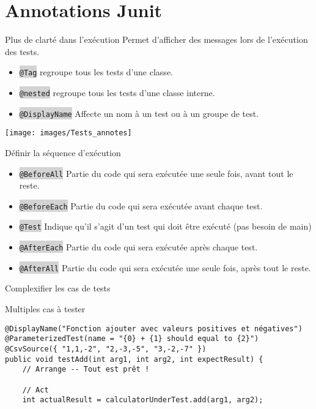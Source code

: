 \documentclass[a4paper]{beamer}
\newcommand{\code}[1]{\colorbox{lightgray}{\lstinline~#1~}}
\begin{document}
{\section{Annotations Junit}
\begin{frame}{Plus de clarté dans l'exécution}
	Permet d'afficher des messages lors de l'exécution des tests.
	\begin{itemize}
		\item \code{@Tag} regroupe tous les tests d'une classe.
		\item \code{@nested} regroupe tous les tests d'une classe interne.
		\item \code{@DisplayName} Affecte un nom à un test ou à un groupe de test.
	\end{itemize}
	\begin{center}
		\texttt{[image: images/Tests\_annotes]}
	\end{center}
\end{frame}

\begin{frame}{Définir la séquence d'exécution}
	\begin{itemize}
		\item \code{@BeforeAll} Partie du code qui sera exécutée une seule fois, avant tout le reste.
		\item \code{@BeforeEach} Partie du code qui sera exécutée avant chaque test.
		\item \code{@Test} Indique qu'il s'agit d'un test qui doit être exécuté (pas besoin de main)
		\item \code{@AfterEach} Partie du code qui sera exécutée après chaque test.
		\item \code{@AfterAll} Partie du code qui sera exécutée une seule fois, après tout le reste.
	\end{itemize}
\end{frame}

\begin{frame}[fragile]{Complexifier les cas de tests}
	\begin{exampleblock}{Multiples cas à tester}\scriptsize
		\begin{lstlisting}
@DisplayName("Fonction ajouter avec valeurs positives et négatives")
@ParameterizedTest(name = "{0} + {1} should equal to {2}")
@CsvSource({ "1,1,-2", "2,-3,-5", "3,-2,-7" })
public void testAdd(int arg1, int arg2, int expectResult) {
    // Arrange -- Tout est prêt !

    // Act
    int actualResult = calculatorUnderTest.add(arg1, arg2);


\end{lstlisting}
\end{exampleblock}
\end{frame}}
\end{document}
